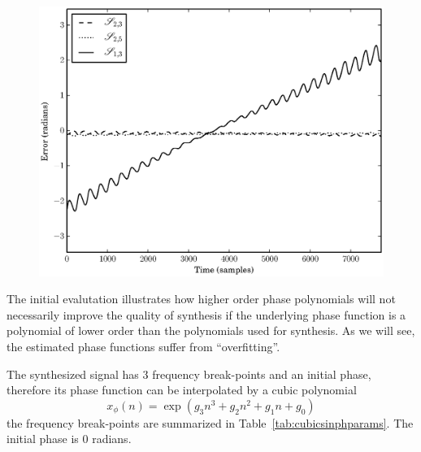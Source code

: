 \begin{figure}[!t]
    \centering
    \includegraphics[width=\figwidthscale\textwidth]{plots/mq_mod_err_comp_phase_err.eps}
\end{figure}

The initial evalutation illustrates how higher order phase polynomials will not
necessarily improve the quality of synthesis if the underlying phase function is
a polynomial of lower order than the polynomials used for synthesis. As we will
see, the estimated phase functions suffer from ``overfitting''.

The synthesized signal has 3 frequency break-points and an initial phase,
therefore its phase function can be interpolated by a cubic polynomial
\[
    x_{\phi}(n) = \exp \left(g_3 n^{3} + g_2 n^{2} + g_1 n + g_0 \right)
\]
the frequency break-points are summarized in Table~\ref{tab:cubicsinphparams}. The
initial phase is $0$ radians.

